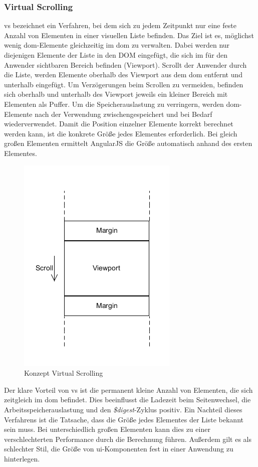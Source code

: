 \subsubsection{Virtual Scrolling}
\gls{vs} bezeichnet ein Verfahren, bei dem sich zu jedem Zeitpunkt nur eine feste Anzahl von Elementen in einer visuellen Liste befinden. Das Ziel ist es, möglichst wenig \gls{dom}-Elemente gleichzeitig im \gls{dom} zu verwalten. Dabei werden nur diejenigen Elemente der Liste in den DOM eingefügt, die sich im für den Anwender sichtbaren Bereich befinden (Viewport). Scrollt der Anwender durch die Liste, werden Elemente oberhalb des Viewport aus dem \gls{dom} entfernt und unterhalb eingefügt. Um Verzögerungen beim Scrollen zu vermeiden, befinden sich oberhalb und unterhalb des Viewport jeweils ein kleiner Bereich mit Elementen als Puffer. Um die Speicherauslastung zu verringern, werden \gls{dom}-Elemente nach der Verwendung zwischengespeichert und bei Bedarf wiederverwendet. Damit die Position einzelner Elemente korrekt berechnet werden kann, ist die konkrete Größe jedes Elementes erforderlich. Bei gleich großen Elementen ermittelt AngularJS die Größe automatisch anhand des ersten Elementes. 
\begin{figure}[h]
	\centering
	\includegraphics[scale=0.4]{Bilder/VirtualScrolling.png}
	\caption{Konzept Virtual Scrolling}
	\label{konzept-virtualscrolling}
\end{figure}
Der klare Vorteil von \gls{vs} ist die permanent kleine Anzahl von Elementen, die sich zeitgleich im \gls{dom} befindet. Dies beeinflusst die Ladezeit beim Seitenwechsel, die Arbeitsspeicherauslastung und den \emph{\$digest}-Zyklus positiv. Ein Nachteil dieses Verfahrens ist die Tatsache, dass die Größe jedes Elementes der Liste bekannt sein muss. Bei unterschiedlich großen Elementen kann dies zu einer verschlechterten Performance durch die Berechnung führen. Außerdem gilt es als schlechter Stil, die Größe von \gls{ui}-Komponenten fest in einer Anwendung zu hinterlegen.

